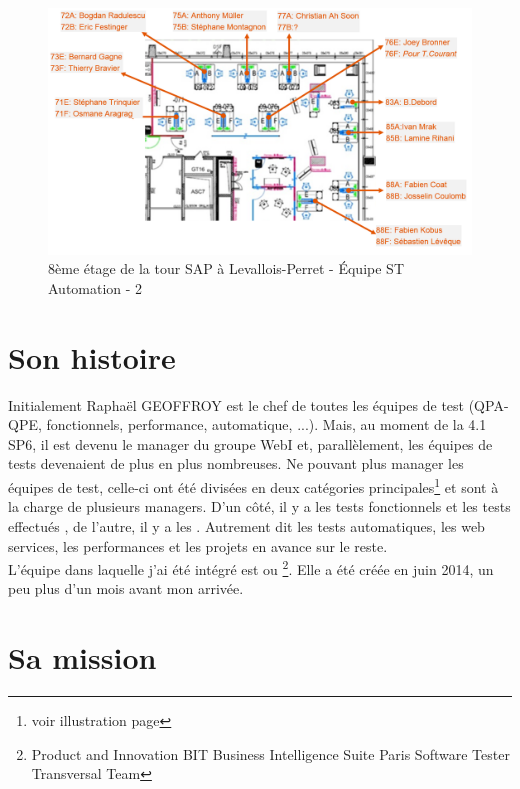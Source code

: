 \begin{figure}[!h]
  \centering
      \includegraphics[width=1.2\textwidth]{images/positionnement2.png}
  \caption{8\`{e}me \'{e}tage de la tour SAP \`{a} Levallois-Perret - \'{E}quipe ST Automation - 2}
	\label{figure:}
\end{figure}

\section{Son histoire}
Initialement Rapha\"{e}l GEOFFROY est le chef de toutes les \'{e}quipes de test (QPA-QPE, fonctionnels, performance, automatique, ...). Mais, au moment de la 4.1 SP6, il est devenu le manager du groupe WebI et, parall\`{e}lement, les \'{e}quipes de tests devenaient de plus en plus nombreuses. Ne pouvant plus manager les \'{e}quipes de test, celle-ci ont \'{e}t\'{e} divis\'{e}es en deux cat\'{e}gories principales\footnote{voir illustration \pageref{figure:allRaphaelTeam2} page \pageref{figure:allRaphaelTeam2}} et sont \`{a} la charge de plusieurs managers. D'un c\^{o}t\'{e}, il y a les tests fonctionnels et les tests effectu\'{e}s , de l'autre, il y a les . Autrement dit les tests automatiques, les web services, les performances et les projets en avance sur le reste.\\

L'\'{e}quipe dans laquelle j'ai \'{e}t\'{e} int\'{e}gr\'{e} est  ou \footnote{Product and Innovation BIT Business Intelligence Suite Paris Software Tester Transversal Team}. Elle a \'{e}t\'{e} cr\'{e}\'{e}e en juin 2014, un peu plus d'un mois avant mon arriv\'{e}e.

\section{Sa mission}

